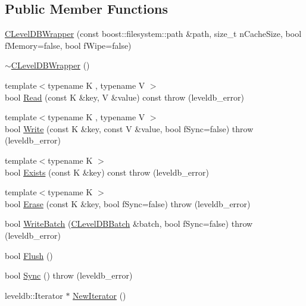 \subsection*{Public Member Functions}
\begin{DoxyCompactItemize}
\item 
\hyperlink{class_c_level_d_b_wrapper_ae796b1190c072df6275e0ada4d187943}{C\+Level\+D\+B\+Wrapper} (const boost\+::filesystem\+::path \&path, size\+\_\+t n\+Cache\+Size, bool f\+Memory=false, bool f\+Wipe=false)
\item 
\hyperlink{class_c_level_d_b_wrapper_a7ffe7edeadfcf521d32509216e95403b}{$\sim$\+C\+Level\+D\+B\+Wrapper} ()
\item 
{\footnotesize template$<$typename K , typename V $>$ }\\bool \hyperlink{class_c_level_d_b_wrapper_aa3b816ae43c930b4bf1f85461bff4b5b}{Read} (const K \&key, V \&value) const   throw (leveldb\+\_\+error)
\item 
{\footnotesize template$<$typename K , typename V $>$ }\\bool \hyperlink{class_c_level_d_b_wrapper_a740caa1aefbafc888838ea7f70dc31f4}{Write} (const K \&key, const V \&value, bool f\+Sync=false)  throw (leveldb\+\_\+error)
\item 
{\footnotesize template$<$typename K $>$ }\\bool \hyperlink{class_c_level_d_b_wrapper_a9c9d2e1c06c45c5d6883f33136f6718b}{Exists} (const K \&key) const   throw (leveldb\+\_\+error)
\item 
{\footnotesize template$<$typename K $>$ }\\bool \hyperlink{class_c_level_d_b_wrapper_a9f67e2880ba191fdc9439ba34e315d72}{Erase} (const K \&key, bool f\+Sync=false)  throw (leveldb\+\_\+error)
\item 
bool \hyperlink{class_c_level_d_b_wrapper_a820484c9e427f9e3400396e750acf4b8}{Write\+Batch} (\hyperlink{class_c_level_d_b_batch}{C\+Level\+D\+B\+Batch} \&batch, bool f\+Sync=false)  throw (leveldb\+\_\+error)
\item 
bool \hyperlink{class_c_level_d_b_wrapper_a639fbfd6652941a1ab570c202197a32a}{Flush} ()
\item 
bool \hyperlink{class_c_level_d_b_wrapper_abd05e914893cd610e8444871f829d8c9}{Sync} ()  throw (leveldb\+\_\+error)
\item 
leveldb\+::\+Iterator $\ast$ \hyperlink{class_c_level_d_b_wrapper_a5f43d01a8a6b26464b875d190e002d74}{New\+Iterator} ()
\end{DoxyCompactItemize}


